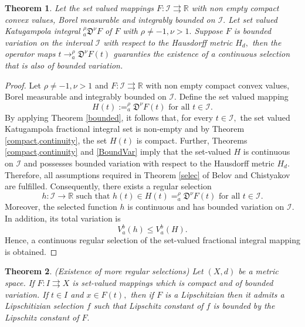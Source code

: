 \documentclass{amsproc}
\newtheorem{theorem}{Theorem}[section]
\theoremstyle{definition}
\theoremstyle{remark}
\numberwithin{equation}{section}
\begin{document}
\begin{theorem} \label{Bvar}
 Let the set valued mappings $F:\mathcal{I} \rightrightarrows \mathbb{R}$ with non empty compact convex values, Borel measurable and integrably bounded on $\mathcal{I}.$ Let set valued Katugampola integral $_a^\rho\mathfrak{D}^\nu F$ of $F$ with $\rho \neq -1, \nu >1.$ Suppose $F$ is bounded variation on the interval $\mathcal{I}$ with respect to the Hausdorff metric $H_d,$ then the operator maps $t \to _a^\rho\mathfrak{D}^\nu F(t)$ guaranties the existence of a continuous selection that is also of bounded variation.
\end{theorem}
\begin{proof}
  Let  $\rho \neq -1, \nu>1$ and $F:\mathcal{I} \rightrightarrows \mathbb{R}$ with non empty compact convex values, Borel measurable and integrably bounded on $\mathcal{I}.$ Define the set valued mapping \[ H(t) := _a^\rho\mathfrak{D}^\nu F(t) \text{ for all } t \in \mathcal{I}.\]
  By applying Theorem \ref{bounded}, it follows that, for every $t \in \mathcal{I},$ the set valued Katugampola fractional integral set is non-empty and by Theorem \ref{compact,continuity}, the set $H(t)$ is compact. Further, Theorems \ref{compact,continuity} and \ref{BoundVar} imply that the set-valued $H$ is continuous on $\mathcal{I}$ and possesses bounded variation with respect to the Hausdorff metric $H_d$.
  Therefore, all assumptions required in Theorem \ref{selec} of Belov and Chistyakov \cite{Belov} are fulfilled. Consequently, there exists a regular selection
  \[ h:\mathcal{I} \to \mathbb{R}\text{ such that } h(t) \in H(t)= _a^\rho\mathfrak{D}^\nu F(t) \text{ for all } t \in \mathcal{I}.\]
  Moreover, the selected function $h$ is continuous and has bounded variation on $\mathcal{I}$. In addition, its total variation is \[ V_a^b(h)\le V_a^b(H). \]
  Hence, a continuous regular selection of the set-valued fractional integral mapping is obtained.
  \end{proof}
  \begin{theorem}(Existence of more regular selections) \label{moreselecton} \cite[Theorem 3]{Belov}
      Let $(X,d)$ be a metric space. If $F:I \rightrightarrows X$ is set-valued mappings which is compact and of bounded variation. If $t \in I$ and $x\in F(t),$ then if $F$ is a Lipschitzian then it admits a Lipschitizian selection $f$ such that Lipschitz constant of $f$ is bounded by the Lipschitz constant of $F.$
  \end{theorem}
  
\end{document}
